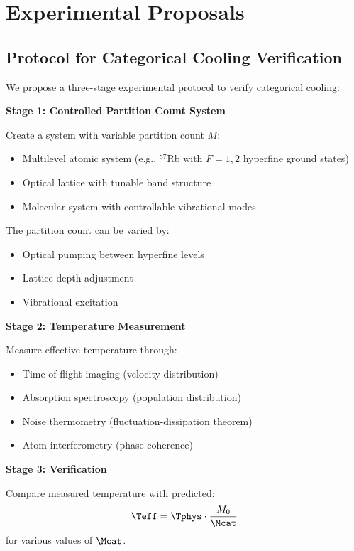 \section{Experimental Proposals}

\subsection{Protocol for Categorical Cooling Verification}

We propose a three-stage experimental protocol to verify categorical cooling:

\textbf{Stage 1: Controlled Partition Count System}

Create a system with variable partition count $M$:
\begin{itemize}
    \item Multilevel atomic system (e.g., $^{87}$Rb with $F = 1, 2$ hyperfine ground states)
    \item Optical lattice with tunable band structure
    \item Molecular system with controllable vibrational modes
\end{itemize}

The partition count can be varied by:
\begin{itemize}
    \item Optical pumping between hyperfine levels
    \item Lattice depth adjustment
    \item Vibrational excitation
\end{itemize}

\textbf{Stage 2: Temperature Measurement}

Measure effective temperature through:
\begin{itemize}
    \item Time-of-flight imaging (velocity distribution)
    \item Absorption spectroscopy (population distribution)
    \item Noise thermometry (fluctuation-dissipation theorem)
    \item Atom interferometry (phase coherence)
\end{itemize}

\textbf{Stage 3: Verification}

Compare measured temperature with predicted:
\begin{equation}
\Teff = \Tphys \cdot \frac{M_0}{\Mcat}
\end{equation}
for various values of $\Mcat$.

